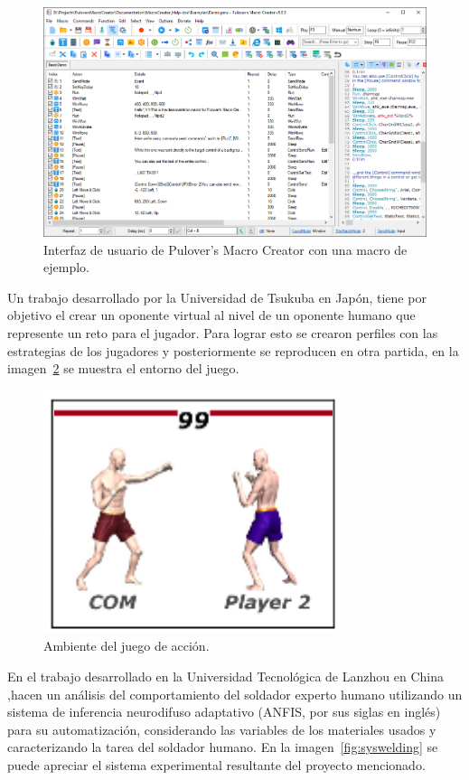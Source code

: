 \begin{figure}[H]
\centering
\includegraphics[width=0.7\columnwidth]{CapituloI/Imagenes/Macros.png}
\caption{Interfaz de usuario de Pulover's Macro Creator con una macro de
 ejemplo.}
\label{fig:macros}
\end{figure}



Un trabajo desarrollado por la Universidad de Tsukuba en
 Japón\cite{Nakano2006}, tiene por objetivo el crear un oponente virtual
 al nivel de un oponente humano que represente un reto para el jugador. Para
 lograr esto se crearon perfiles con las estrategias de los jugadores y
 posteriormente se reproducen en otra partida, en la imagen~\ref{fig:imitat}
 se muestra el entorno del juego.


\begin{figure}[H]
\centering
\includegraphics[width=0.5\columnwidth]{CapituloI/Imagenes/Imitating.png}
\caption{Ambiente del juego de acción.}
\label{fig:imitat}
\end{figure}


En el trabajo desarrollado en la Universidad Tecnológica de Lanzhou en China
 \cite{Zhang2017},hacen un análisis del comportamiento del soldador experto
 humano utilizando un sistema de inferencia neurodifuso adaptativo (ANFIS,
 por sus siglas en inglés) para su automatización, considerando las variables
 de los materiales usados y caracterizando la tarea del soldador humano.
 En la imagen~\ref{fig:syswelding} se puede apreciar el sistema experimental
  resultante del proyecto mencionado.


